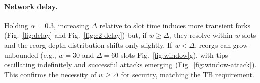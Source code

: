 \paragraph{Network delay.}
Holding $\alpha=0.3$, increasing $\Delta$ relative to slot time induces more transient forks (Fig.~\ref{fig:delay} and Fig.~\ref{fig:c2-delay}) but, if $w\ge\Delta$, they resolve within $w$ slots and the reorg-depth distribution shifts only slightly. If $w<\Delta$, reorgs can grow unbounded (e.g., $w=30$ and $\Delta=60$ slots Fig.~\ref{fig:window}g), with tips oscillating indefinitely and successful attacks emerging (Fig.~\ref{fig:window-attack}). This confirms the necessity of $w\ge\Delta$ for security, matching the TB requirement.


